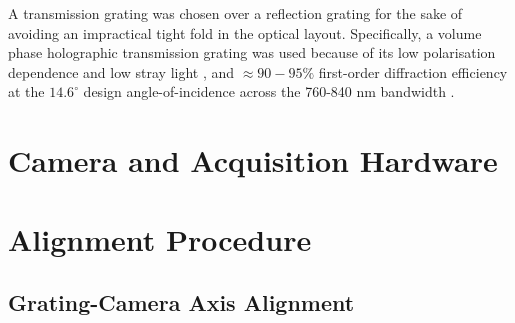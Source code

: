 A transmission grating was chosen over a reflection grating for the sake of
avoiding an impractical tight fold in the optical layout. Specifically, a 
volume phase holographic transmission grating was used because of its 
low polarisation dependence and low stray light \cite{thorlabsvph2026}, 
and $\approx 90-95\%$ first-order diffraction 
efficiency at the $14.6^\circ$ design angle-of-incidence across the 760-840
nm bandwidth \cite{thorlabsgp1006l2026}.



\section{Camera and Acquisition Hardware}
\label{sec:optical-camera}


\section{Alignment Procedure}
\label{sec:optical-alignment}

\subsection{Grating-Camera Axis Alignment}
\label{sec:optical-grating-camera-alignment}

